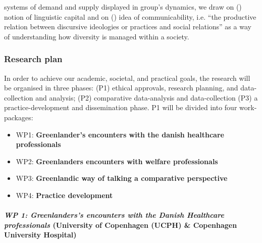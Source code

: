 \documentclass[twocolumn, issue, rga, authordate]{jote-new-article}
\begin{document}
systems of demand and supply displayed in group's dynamics, we draw on  (\citeyear{Bourdieu1991}) notion of linguistic capital and on  (\citeyear{Briggs2005}) idea of communicability, i.e. ``the productive relation between discursive ideologies or practices and social relations'' as a way of understanding how diversity is managed within a society.


\subsubsection{Research plan}


In order to achieve our academic, societal, and practical goals, the research will be organised in three phases: (P1) ethical approvals, research planning, and data-collection and analysis; (P2) comparative data-analysis and data-collection (P3) a practice-development and dissemination phase. P1 will be divided into four work-packages:

\begin{itemize}
\item WP1: \textbf{Greenlander's encounters with the danish healthcare professionals}


\item WP2:
\textbf{Greenlanders encounters with welfare professionals}


\item WP3:
\textbf{Greenlandic way of talking a comparative perspective}


\item WP4:
\textbf{Practice development}
        \end{itemize}


\paragraph{\emph{WP 1: Greenlanders's encounters with the Danish Healthcare professionals} (University of Copenhagen (UCPH) \& Copenhagen University Hospital)}
\end{document}
